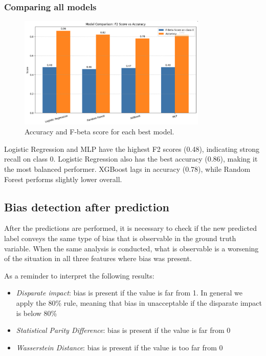 \documentclass{article}
\begin{document}
\subsubsection{Comparing all models}
\begin{figure}[]
  \centering
  \includegraphics[width=0.8\textwidth]{model_comparison.png}
  \caption{Accuracy and F-beta score for each best model.}
  \label{fig:model_comparison}
\end{figure}
Logistic Regression and MLP have the highest F2 scores (0.48), indicating strong recall on class 0. Logistic Regression also has the best accuracy (0.86), making it the most balanced performer. XGBoost lags in accuracy (0.78), while Random Forest performs slightly lower overall.
\newpage
\subsection{Bias detection after prediction}
After the predictions are performed, it is necessary to check if the new predicted label conveys the same type of bias that is observable in the ground truth variable. When the same analysis is conducted, what is observable is a worsening of the situation in all three features where bias was present. 

As a reminder to interpret the following results:
\begin{itemize}
    \item \textit{Disparate impact}: bias is present if the value is far from 1. In general we apply the 80\% rule, meaning that bias in unacceptable if the disparate impact is below 80\%
    \item \textit{Statistical Parity Difference}: bias is present if the value is far from 0
    \item \textit{Wasserstein Distance}: bias is present if the value is too far from 0
\end{itemize}
\end{document}
